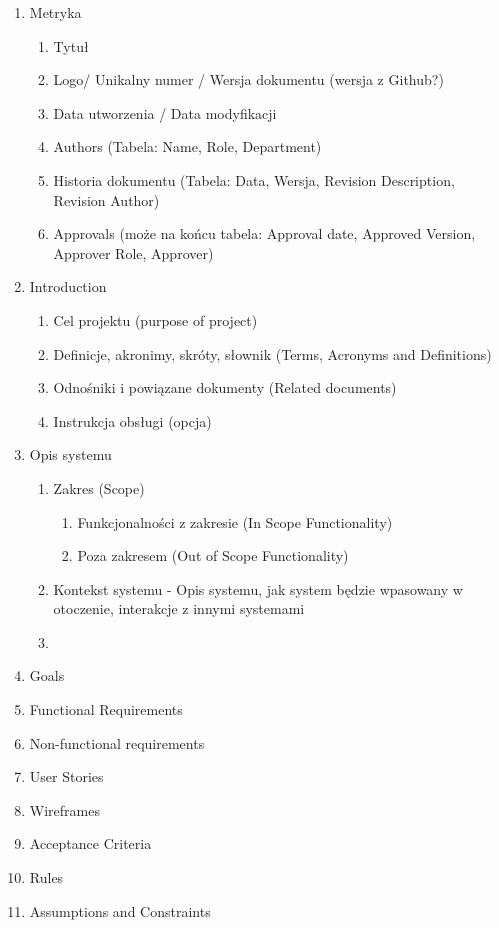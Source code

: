 \documentclass[
  a4paper,
  DIV=11,
  numbers=noendperiod,
  oneside,
  open=any]{scrreprt}
\providecommand{\tightlist}{%
  \setlength{\itemsep}{0pt}\setlength{\parskip}{0pt}}\usepackage{longtable,booktabs,array}
\begin{document}
\begin{enumerate}
\def\labelenumi{\arabic{enumi}.}
\setcounter{enumi}{-1}
\item
  Metryka

  \begin{enumerate}
  \def\labelenumii{\arabic{enumii}.}
  \tightlist
  \item
    Tytuł
  \item
    Logo/ Unikalny numer / Wersja dokumentu (wersja z Github?)
  \item
    Data utworzenia / Data modyfikacji
  \item
    Authors (Tabela: Name, Role, Department)
  \item
    Historia dokumentu (Tabela: Data, Wersja, Revision Description,
    Revision Author)
  \item
    Approvals (może na końcu tabela: Approval date, Approved Version,
    Approver Role, Approver)
  \end{enumerate}
\item
  Introduction

  \begin{enumerate}
  \def\labelenumii{\arabic{enumii}.}
  \tightlist
  \item
    Cel projektu (purpose of project)
  \item
    Definicje, akronimy, skróty, słownik (Terms, Acronyms and
    Definitions)
  \item
    Odnośniki i powiązane dokumenty (Related documents)
  \item
    Instrukcja obsługi (opcja)
  \end{enumerate}
\item
  Opis systemu

  \begin{enumerate}
  \def\labelenumii{\arabic{enumii}.}
  \tightlist
  \item
    Zakres (Scope)

    \begin{enumerate}
    \def\labelenumiii{\arabic{enumiii}.}
    \tightlist
    \item
      Funkcjonalności z zakresie (In Scope Functionality)
    \item
      Poza zakresem (Out of Scope Functionality)
    \end{enumerate}
  \item
    Kontekst systemu - Opis systemu, jak system będzie wpasowany w
    otoczenie, interakcje z innymi systemami
  \item
  \end{enumerate}
\item
  Goals
\item
  Functional Requirements
\item
  Non-functional requirements
\item
  User Stories
\item
  Wireframes
\item
  Acceptance Criteria
\item
  Rules
\item
  Assumptions and Constraints
\end{enumerate}
\end{document}
